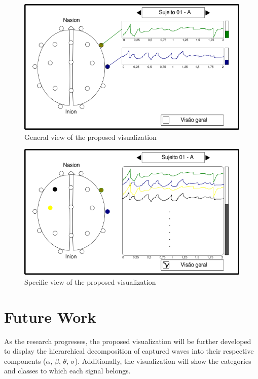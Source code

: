 \documentclass[format=acmtog]{acmart}
\begin{document}
	\begin{figure}
		\centering
		\includegraphics[width=\linewidth]{../presentation/images/g3714}
		\caption{General view of the proposed visualization}
		\label{fig:g3714}
	\end{figure}
	
	\begin{figure}
		\centering
		\includegraphics[width=\linewidth]{../presentation/images/g3762}
		\caption{Specific view of the proposed visualization}
		\label{fig:g3762}
	\end{figure}
	
	\section{Future Work}
	As the research progresses, the proposed visualization will be further developed to display the hierarchical decomposition of captured waves into their respective components ($\alpha$, $\beta$, $\theta$, $\sigma$). Additionally, the visualization will show the categories and classes to which each signal belongs.
	
\end{document}
